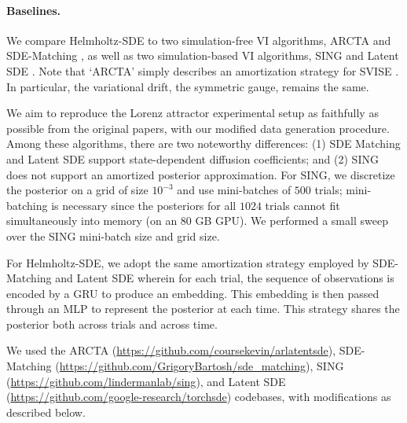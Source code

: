 \paragraph{Baselines.}
We compare Helmholtz-SDE to two simulation-free VI algorithms, ARCTA \cite{course2023amortized} and SDE-Matching \cite{bartosh2025sde}, as well as two simulation-based VI algorithms, SING \cite{hu2025sing} and Latent SDE \cite{li2020scalable}.
Note that `ARCTA' simply describes an amortization strategy for SVISE \cite{course2023state}. In particular, the variational drift, the symmetric gauge, remains the same.

We aim to reproduce the Lorenz attractor experimental setup as faithfully as possible from the original papers, with our modified data generation procedure. 
Among these algorithms, there are two noteworthy differences: 
(1) SDE Matching \cite{bartosh2025sde} and Latent SDE \cite{li2020scalable} support state-dependent diffusion coefficients; 
and (2) SING does not support an amortized posterior approximation. 
For SING, we discretize the posterior on a grid of size $10^{-3}$ and use mini-batches of $500$ trials; mini-batching is necessary since the posteriors for all $1024$ trials cannot fit simultaneously into memory (on an 80 GB GPU).
We performed a small sweep over the SING mini-batch size and grid size.

For Helmholtz-SDE, we adopt the same amortization strategy employed by SDE-Matching \cite{bartosh2025sde} and Latent SDE \cite{li2020scalable} wherein for each trial, the sequence of observations is encoded by a GRU to produce an embedding. 
This embedding is then passed through an MLP to represent the posterior at each time. 
This strategy shares the posterior both across trials and across time.

We used the ARCTA (\url{https://github.com/coursekevin/arlatentsde}), SDE-Matching (\url{https://github.com/GrigoryBartosh/sde_matching}), SING (\url{https://github.com/lindermanlab/sing}), and Latent SDE (\url{https://github.com/google-research/torchsde}) codebases, with modifications as described below.

